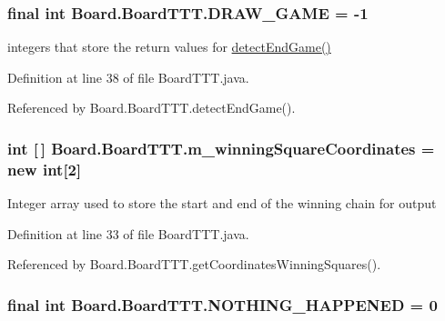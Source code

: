 \subsubsection[{D\+R\+A\+W\+\_\+\+G\+A\+M\+E}]{\setlength{\rightskip}{0pt plus 5cm}final int Board.\+Board\+T\+T\+T.\+D\+R\+A\+W\+\_\+\+G\+A\+M\+E = -\/1\hspace{0.3cm}{\ttfamily [static]}}\label{class_board_1_1_board_t_t_t_a16be9cbe57d43388a3fa6e5b706210e5}
integers that store the return values for \hyperlink{class_board_1_1_board_t_t_t_a08f36da4210111d8f129be28a550334e}{detect\+End\+Game()} 

Definition at line 38 of file Board\+T\+T\+T.\+java.



Referenced by Board.\+Board\+T\+T\+T.\+detect\+End\+Game().

\hypertarget{class_board_1_1_board_t_t_t_a50bc789f0168c29495d4827cca10c89f}{}
\subsubsection[{m\+\_\+winning\+Square\+Coordinates}]{\setlength{\rightskip}{0pt plus 5cm}int \mbox{[}$\,$\mbox{]} Board.\+Board\+T\+T\+T.\+m\+\_\+winning\+Square\+Coordinates = new int\mbox{[}2\mbox{]}\hspace{0.3cm}{\ttfamily [private]}}\label{class_board_1_1_board_t_t_t_a50bc789f0168c29495d4827cca10c89f}
Integer array used to store the start and end of the winning chain for output 

Definition at line 33 of file Board\+T\+T\+T.\+java.



Referenced by Board.\+Board\+T\+T\+T.\+get\+Coordinates\+Winning\+Squares().

\hypertarget{class_board_1_1_board_t_t_t_a5448324216e6a32d3264e50779962562}{}
\subsubsection[{N\+O\+T\+H\+I\+N\+G\+\_\+\+H\+A\+P\+P\+E\+N\+E\+D}]{\setlength{\rightskip}{0pt plus 5cm}final int Board.\+Board\+T\+T\+T.\+N\+O\+T\+H\+I\+N\+G\+\_\+\+H\+A\+P\+P\+E\+N\+E\+D = 0\hspace{0.3cm}{\ttfamily [static]}}\label{class_board_1_1_board_t_t_t_a5448324216e6a32d3264e50779962562}


